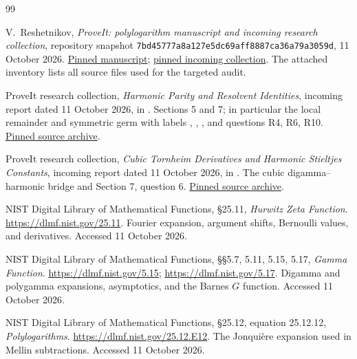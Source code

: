 \begin{thebibliography}{99}

V.~Reshetnikov, \emph{ProveIt: polylogarithm manuscript and incoming
research collection}, repository snapshot
\texttt{7bd45777a8a127e5dc69aff8887ca36a79a3059d},
11 October 2026.
\href{https://github.com/VladimirReshetnikov/ProveIt/tree/7bd45777a8a127e5dc69aff8887ca36a79a3059d/Analysis/Polylogarithms/docs/manuscript}{Pinned manuscript};
\href{https://github.com/VladimirReshetnikov/ProveIt/tree/7bd45777a8a127e5dc69aff8887ca36a79a3059d/docs/incoming}{pinned incoming collection}.
The attached inventory lists all source files used for the targeted audit.

ProveIt research collection,
\emph{Harmonic Parity and Resolvent Identities},
incoming report dated 11 October 2026, in \cite{bhr:ProveIt}.
Sections 5 and 7; in particular the local remainder and symmetric
germ with labels , , ,
and questions R4, R6, R10.
\href{https://github.com/VladimirReshetnikov/ProveIt/blob/7bd45777a8a127e5dc69aff8887ca36a79a3059d/docs/incoming/ProveIt_Harmonic_Parity_and_Resolvent_Identities_2026-10-11.zip}{Pinned source archive}.

ProveIt research collection,
\emph{Cubic Tornheim Derivatives and Harmonic Stieltjes Constants},
incoming report dated 11 October 2026, in \cite{bhr:ProveIt}.
The cubic digamma--harmonic bridge and Section 7, question 6.
\href{https://github.com/VladimirReshetnikov/ProveIt/blob/7bd45777a8a127e5dc69aff8887ca36a79a3059d/docs/incoming/ProveIt_Cubic_Harmonic_Mixed_Orders_2026-10-11.zip}{Pinned source archive}.

NIST Digital Library of Mathematical Functions,
\S25.11, \emph{Hurwitz Zeta Function}.
\url{https://dlmf.nist.gov/25.11}.
Fourier expansion, argument shifts, Bernoulli values, and derivatives.
Accessed 11 October 2026.

NIST Digital Library of Mathematical Functions,
\S\S5.7, 5.11, 5.15, 5.17, \emph{Gamma Function}.
\url{https://dlmf.nist.gov/5.15};
\url{https://dlmf.nist.gov/5.17}.
Digamma and polygamma expansions, asymptotics, and the Barnes $G$ function.
Accessed 11 October 2026.

NIST Digital Library of Mathematical Functions,
\S25.12, equation 25.12.12, \emph{Polylogarithms}.
\url{https://dlmf.nist.gov/25.12.E12}.
The Jonqui\`ere expansion used in Mellin subtractions.
Accessed 11 October 2026.


\end{thebibliography}
